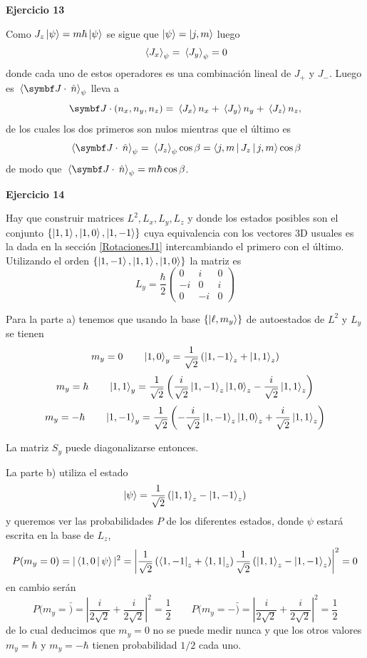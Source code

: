 \documentclass[10pt,oneside]{CBFT_book}
\begin{document}
\begin{ejemplo}{\bf Ejercicio 13}

Como $J_z\Ket{\psi} = m \hbar \Ket{\psi}$ se sigue que $\Ket{\psi}= \Ket{j,m}$ luego
\[
	\:\left\langle J_x \right\rangle_{\psi} = \:\left\langle J_y \right\rangle_{\psi} = 0
\]
donde cada uno de estos operadores es una combinación lineal de $J_+$ y $J_-$. Luego es 
$\vm{\vb{J}\cdot\nver}_{\psi}$ lleva a 
\[
	\vb{J}\cdot( n_x, n_y, n_z) = \vm{J_x} n_x + \vm{J_y} n_y + \vm{J_z} n_z,
\]
de los cuales los dos primeros son nulos mientras que el último es
\[
	\vm{\vb{J}\cdot\nver}_{\psi} =
	\vm{J_z}_{\psi} \cos\b = \Braket{j,m|J_z|j,m}\cos\b  
\]
de modo que $\vm{\vb{J}\cdot\nver}_{\psi} = m \hbar \cos\b$.

\end{ejemplo}

\begin{ejemplo}{\bf Ejercicio 14}

Hay que construir matrices $L^2, L_x, L_y, L_z$ y donde los estados posibles son el conjunto
$\{ \Ket{1,1}, \Ket{1,0}, \Ket{1,-1} \}$ cuya equivalencia con los vectores 3D usuales es la
dada en la sección \ref{RotacionesJ1} intercambiando el primero con el último.
Utilizando el orden $\{ \Ket{1,-1}, \Ket{1,1}, \Ket{1,0} \}$ la matriz es
\[
	L_y = \frac{\hbar}{2} \begin{pmatrix}
		0  & i  & 0 \\
		-i & 0  & i \\
		0  & -i & 0 
	      \end{pmatrix}
\]

Para la parte a) tenemos que usando la base $\{ \Ket{\ell,m_y} \}$ de autoestados de $L^2$ y 
$L_y$ se tienen
\[
	m_y = 0 \qquad \Ket{1,0}_y = 
	\frac{1}{\sqrt{2}} \left( \Ket{1,-1}_z + \Ket{1,1}_z \right)
\]
\[
	m_y = \hbar \qquad \Ket{1,1}_y = 
	\frac{1}{\sqrt{2}} \left( \frac{i}{\sqrt{2}} \Ket{1,-1}_z 
	\Ket{1,0}_z - \frac{i}{\sqrt{2}}  \Ket{1,1}_z \right)
\]
\[
	m_y = -\hbar \qquad \Ket{1,-1}_y = 
	\frac{1}{\sqrt{2}} \left( -\frac{i}{\sqrt{2}} \Ket{1,-1}_z 
	\Ket{1,0}_z + \frac{i}{\sqrt{2}}  \Ket{1,1}_z \right)
\]

La matriz $S_y$ puede diagonalizarse entonces.

La parte b) utiliza el estado
\[
	\Ket{\psi} = \frac{1}{\sqrt{2}} \left( \Ket{1,1}_z - \Ket{1,-1}_z \right)
\]
y queremos ver las probabilidades $P$ de los diferentes estados, donde $\psi$ estará escrita en
la base de $L_z$,
\[
	P(m_y=0) = |\Braket{1,0|\psi}|^2 =
	\left| \frac{1}{\sqrt{2}} \left( \Bra{1,-1}_z + \Bra{1,1}_z \right) 
	\frac{1}{\sqrt{2}} \left( \Ket{1,1}_z - \Ket{1,-1}_z \right) \right|^2 = 0
\]
en cambio serán
\[
	P(m_y=\bar) = \left| \frac{i}{2\sqrt{2}} + \frac{i}{2\sqrt{2}} \right|^2 = \frac{1}{2}
	\qquad 
	P(m_y=-\bar) = \left| \frac{i}{2\sqrt{2}} + \frac{i}{2\sqrt{2}} \right|^2 = \frac{1}{2}
\]
de lo cual deducimos que $m_y = 0$ no se puede medir nunca y que los otros valores $m_y=\hbar$ y
$m_y =-\hbar$ tienen probabilidad $1/2$ cada uno.


\end{ejemplo}
\end{document}
